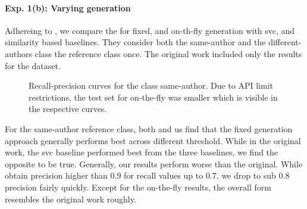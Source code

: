 \paragraph{Exp. 1(b): Varying \imp{} generation}

Adhereing to \citet{koppel_determining_2014}, we compare the \impAppr{} for fixed, and on-th-fly \imp{} generation with \ac{svc}, and similarity based baselines.
They consider both the same-author and the different-authors class the reference class once.
The original work included only the results for the \dataBlog{} dataset.

\begin{figure}[htbp]
  \centering
  \begin{subfigure}[b]{0.48\textwidth}
    \centering
    
    \caption{\dataBlog{}}
    \label{fig:blog_same_author}
  \end{subfigure}
  \hfill
  \begin{subfigure}[b]{0.48\textwidth}
    \centering
    
    \caption{\dataStudent{}}
    \label{fig:student_essays_same_author}
  \end{subfigure}
  \caption{Recall-precision curves for the class same-author. Due to API limit restrictions, the test set for on-the-fly was smaller which is visible in the respective curves.}
  \label{fig:same_authors}
\end{figure}

For the same-author reference class, both \citet{koppel_determining_2014} and us find that the fixed \imp{} generation approach generally performs best across different threshold.
While in the original work, the \ac{svc} baseline performed best from the three baselines, we find the opposite to be true.
Generally, our results perform worse than the original. 
While \citet{koppel_determining_2014} obtain precision higher than $0.9$ for recall values up to $0.7$, we drop to sub $0.8$ precision fairly quickly.
Except for the on-the-fly results, the overall form resembles the original work roughly.


